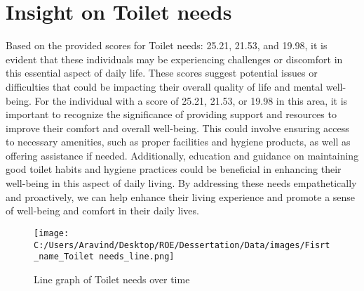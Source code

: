 \documentclass[10pt, a4paper]{article}%
\begin{document}
\section{Insight on Toilet needs}%
\label{sec:InsightonToiletneeds}%
Based on the provided scores for Toilet needs: 25.21, 21.53, and 19.98, it is evident that these individuals may be experiencing challenges or discomfort in this essential aspect of daily life. These scores suggest potential issues or difficulties that could be impacting their overall quality of life and mental well{-}being.\newline%
\newline%
For the individual with a score of 25.21, 21.53, or 19.98 in this area, it is important to recognize the significance of providing support and resources to improve their comfort and overall well{-}being. This could involve ensuring access to necessary amenities, such as proper facilities and hygiene products, as well as offering assistance if needed. Additionally, education and guidance on maintaining good toilet habits and hygiene practices could be beneficial in enhancing their well{-}being in this aspect of daily living.\newline%
\newline%
By addressing these needs empathetically and proactively, we can help enhance their living experience and promote a sense of well{-}being and comfort in their daily lives.%


\begin{figure}[H]%
\centering%
\texttt{[image: C:/Users/Aravind/Desktop/ROE/Dessertation/Data/images/Fisrt\_name\_Toilet needs\_line.png]}%
\caption{Line graph of Toilet needs over time}%
\end{figure}

%
\end{document}
